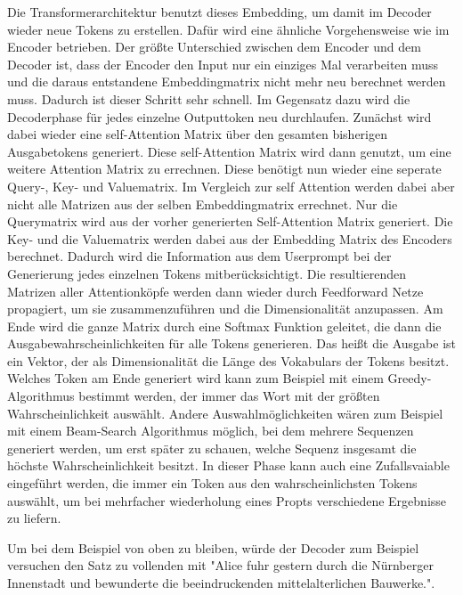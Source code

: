 Die Transformerarchitektur benutzt dieses Embedding, um damit im Decoder wieder neue Tokens zu erstellen.
Dafür wird eine ähnliche Vorgehensweise wie im Encoder betrieben.
Der größte Unterschied zwischen dem Encoder und dem Decoder ist, dass der Encoder den Input nur ein einziges Mal verarbeiten muss und die daraus entstandene Embeddingmatrix nicht mehr neu berechnet werden muss.
Dadurch ist dieser Schritt sehr schnell.
Im Gegensatz dazu wird die Decoderphase für jedes einzelne Outputtoken neu durchlaufen.
Zunächst wird dabei wieder eine self-Attention Matrix über den gesamten bisherigen Ausgabetokens generiert.
Diese self-Attention Matrix wird dann genutzt, um eine weitere Attention Matrix zu errechnen.
Diese benötigt nun wieder eine seperate Query-, Key- und Valuematrix.
Im Vergleich zur self Attention werden dabei aber nicht alle Matrizen aus der selben Embeddingmatrix errechnet.
Nur die Querymatrix wird aus der vorher generierten Self-Attention Matrix generiert.
Die Key- und die Valuematrix werden dabei aus der Embedding Matrix des Encoders berechnet. 
Dadurch wird die Information aus dem Userprompt bei der Generierung jedes einzelnen Tokens mitberücksichtigt. 
Die resultierenden Matrizen aller Attentionköpfe werden dann wieder durch Feedforward Netze propagiert, um sie zusammenzuführen und die Dimensionalität anzupassen.
Am Ende wird die ganze Matrix durch eine Softmax Funktion geleitet, die dann die Ausgabewahrscheinlichkeiten für alle Tokens generieren.
Das heißt die Ausgabe ist ein Vektor, der als Dimensionalität die Länge des Vokabulars der Tokens besitzt.
Welches Token am Ende generiert wird kann zum Beispiel mit einem Greedy-Algorithmus bestimmt werden, der immer das Wort mit der größten Wahrscheinlichkeit auswählt.
Andere Auswahlmöglichkeiten wären zum Beispiel mit einem Beam-Search Algorithmus möglich, bei dem mehrere Sequenzen generiert werden, um erst später zu schauen, welche Sequenz insgesamt die höchste Wahrscheinlichkeit besitzt.
In dieser Phase kann auch eine Zufallsvaiable eingeführt werden, die immer ein Token aus den wahrscheinlichsten Tokens auswählt, um bei mehrfacher wiederholung eines Propts verschiedene Ergebnisse zu liefern.

Um bei dem Beispiel von oben zu bleiben, würde der Decoder zum Beispiel versuchen den Satz zu vollenden mit  "Alice fuhr gestern durch die Nürnberger Innenstadt und bewunderte die beeindruckenden mittelalterlichen Bauwerke.".
\cite{vaswani2023}

